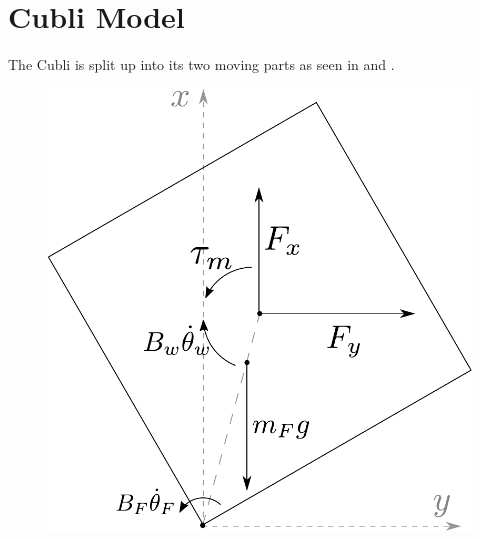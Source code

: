 \section{Cubli Model}
The Cubli is split up into its two moving parts as seen in  and .

  \begin{minipage}{\linewidth}
  	\begin{minipage}{0.45\linewidth}
  		\begin{figure}[H]
  			\includegraphics[scale=.5]{figures/freeBodyFrame}
  			\centering
  			\captionsetup{justification=centering}
  			\label{freeBodyFrame}
  		\end{figure}\vspace{-5mm}
  	\end{minipage}
  	\hspace{0.03\linewidth}
  	\begin{minipage}{0.45\linewidth}
  		\begin{figure}[H]

\end{figure}
\end{minipage}
\end{minipage}
